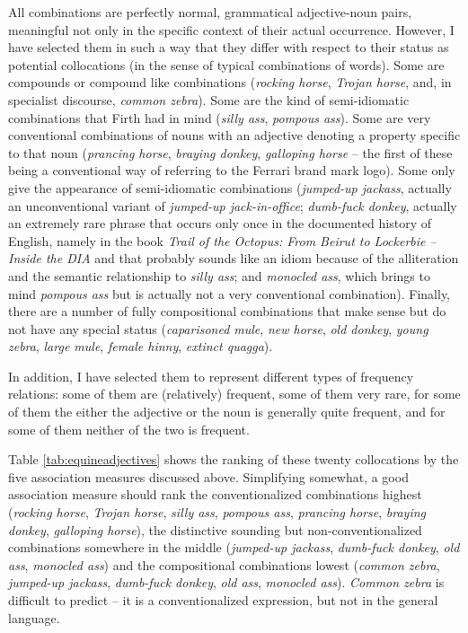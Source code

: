 
All combinations are perfectly normal, grammatical adjective-noun pairs, meaningful not only in the specific context of their actual occurrence. However, I have selected them in such a way that they differ with respect to their status as potential collocations (in the sense of typical combinations of words). Some are compounds or compound like combinations (\textit{rocking horse}, \textit{Trojan horse}, and, in specialist discourse, \textit{common zebra}). Some are the kind of semi-idiomatic combinations that Firth had in mind (\textit{silly ass}, \textit{pompous ass}). Some are very conventional combinations of nouns with an adjective denoting a property specific to that noun (\textit{prancing horse}, \textit{braying donkey}, \textit{galloping horse} -- the first of these being a conventional way of referring to the Ferrari brand mark logo). Some only give the appearance of semi-idiomatic combinations (\textit{jumped-up jackass}, actually an unconventional variant of \textit{jumped-up jack-in-office}; \textit{dumb-fuck donkey}, actually an extremely rare phrase that occurs only once in the documented history of English, namely in the book \textit{Trail of the Octopus: From Beirut to Lockerbie -- Inside the DIA} and that probably sounds like an idiom because of the alliteration and the semantic relationship to \textit{silly ass}; and \textit{monocled ass}, which brings to mind \textit{pompous ass} but is actually not a very conventional combination). Finally, there are a number of fully compositional combinations that make sense but do not have any special status (\textit{caparisoned mule}, \textit{new horse}, \textit{old donkey}, \textit{young zebra}, \textit{large mule}, \textit{female hinny}, \textit{extinct quagga}).

In addition, I have selected them to represent different types of frequency relations: some of them are (relatively) frequent, some of them very rare, for some of them the either the adjective or the noun is generally quite frequent, and for some of them neither of the two is frequent.

Table \ref{tab:equineadjectives} shows the ranking of these twenty collocations by the five association measures discussed above. Simplifying somewhat, a good association measure should rank the conventionalized combinations highest (\textit{rocking horse}, \textit{Trojan horse}, \textit{silly ass}, \textit{pompous ass}, \textit{prancing horse}, \textit{braying donkey}, \textit{galloping horse}), the distinctive sounding but non-conventionalized combinations somewhere in the middle (\textit{jumped-up jackass}, \textit{dumb-fuck donkey}, \textit{old ass}, \textit{monocled ass}) and the compositional combinations lowest (\textit{common zebra}, \textit{jumped-up jackass}, \textit{dumb-fuck donkey}, \textit{old ass}, \textit{monocled ass}). \textit{Common zebra} is difficult to predict -- it is a conventionalized expression, but not in the general language.

